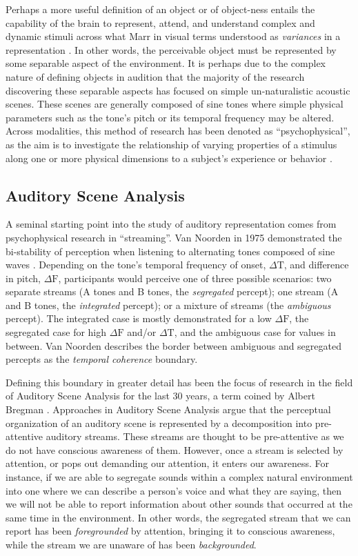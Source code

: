 \documentclass[a4paper,10pt,final]{ThesisStyle}
\begin{document}
Perhaps a more useful definition of an object or of object-ness entails the capability of the brain to represent, attend, and understand complex and dynamic stimuli across what Marr in visual terms understood as \textit{variances} in a representation \cite{Marr1982}.  In other words, the perceivable object must be represented by some separable aspect of the environment.   It is perhaps due to the complex nature of defining objects in audition that the majority of the research discovering these separable aspects has focused on simple un-naturalistic acoustic scenes.  These scenes are generally composed of sine tones where simple physical parameters such as the tone's pitch or its temporal frequency may be altered.  Across modalities, this method of research has been denoted as ``psychophysical'', as the aim is to investigate the relationship of varying properties of a stimulus along one or more physical dimensions to a subject's experience or behavior \cite{}. 

\subsection{Auditory Scene Analysis}

A seminal starting point into the study of auditory representation comes from psychophysical research in ``streaming''.  Van Noorden in 1975 demonstrated the bi-stability of perception when listening to alternating tones composed of sine waves \cite{Noorden1975}.  Depending on the tone's temporal frequency of onset, $\Delta \text{T}$, and difference in pitch, $\Delta \text{F}$, participants would perceive one of three possible scenarios: two separate streams (A tones and B tones, the \textit{segregated} percept); one stream (A and B tones, the \textit{integrated} percept); or a mixture of streams (the \textit{ambiguous} percept).  The integrated case is mostly demonstrated for a low $\Delta \text{F}$, the segregated case for high $\Delta \text{F}$ and/or $\Delta \text{T}$, and the ambiguous case for values in between.  Van Noorden describes the border between ambiguous and segregated percepts as the \textit{temporal coherence} boundary.  

Defining this boundary in greater detail has been the focus of research in the field of Auditory Scene Analysis for the last 30 years, a term coined by Albert Bregman \cite{Bregman1990}.  Approaches in Auditory Scene Analysis argue that the perceptual organization of an auditory scene is represented by a decomposition into pre-attentive auditory streams.  These streams are thought to be pre-attentive as we do not have conscious awareness of them.  However, once a stream is selected by attention, or pops out demanding our attention, it enters our awareness.  For instance, if we are able to segregate sounds within a complex natural environment into one where we can describe a person's voice and what they are saying, then we will not be able to report information about other sounds that occurred at the same time in the environment.  In other words, the segregated stream that we can report has been \textit{foregrounded} by attention, bringing it to conscious awareness, while the stream we are unaware of has been \textit{backgrounded}.  
\end{document}
